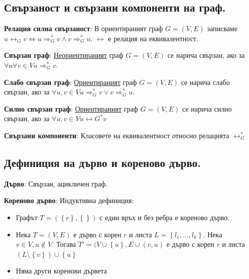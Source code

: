 \documentclass{article}
\renewcommand{\\}{\newline}
\begin{document}
      \subsection{Свързаност и свързани компоненти на граф.} 
      \textbf{Релация силна свързаност}: В ориентираният граф \(G = (V, E)\) записваме \(u \leftrightarrow_{G} v \iff u \Rightarrow^{*}_{G} v \land v \Rightarrow^{*}_{G} u\). \\\(\leftrightarrow\) е релация на еквивалентност.    

      \textbf{Свързан граф}: \underline{Неориентираният} граф \(G = (V, E)\) се нарича свързан, ако за \(\forall u \forall v \in V u \Rightarrow_{G}^{*} v\).

      \textbf{Слабо свързан граф}: \underline{Ориентираният} граф \(G = (V, E)\) се нарича слабо свързан, ако за \(\forall u, v \in V u \Rightarrow_{G}^{*} v \lor v \Rightarrow_{G}^{*} u\).

      \textbf{Силно свързан граф}: \underline{Ориентираният} граф \(G = (V, E)\) се нарича силно свързан, ако за \(\forall u, v \in V u \leftrightarrow{G}^{*} v\)

      \textbf{Свързани компоненти}: Класовете на еквивалентност относно релацията \(\leftrightarrow_{G}^{*}\)  

      \subsection{Дефиниция на дърво и кореново дърво.} 
      \textbf{Дърво}: Свързан, ацикличен граф. 

      \textbf{Кореново дърво}: Индуктивна дефиниция:
      \begin{itemize}
          \item Графът \(T = (\left\{r\right\}, \left\{\right\})\) с един връх и без ребра е кореново дърво. 
          \item Нека \(T = (V, E)\) е дърво с корен \(r\) и листа \(L = \left\{l_{1}, \dots, l_{k}\right\}\). Нека \(v \in V, u \not\in V\). Тогава \(T' = (V\cup \left\{u\right\}, E \cup (v, u)\) е дърво с корен \(r\) и листа \((L \setminus \left\{v\right\})\cup \left\{u\right\}\)     
          \item Няма други коренови дървета
      \end{itemize}
\end{document}
